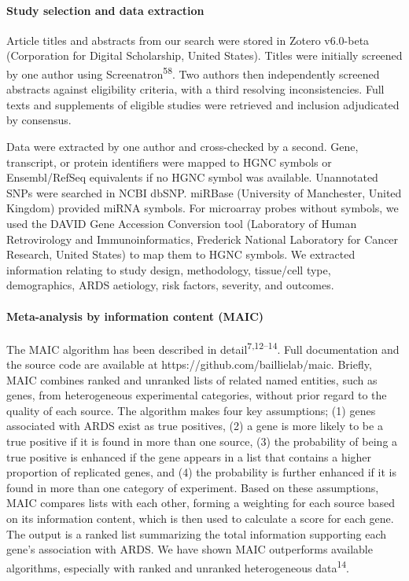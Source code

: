 \documentclass[
  11,
  a4paper,
]{article}
\let\oldparagraph\paragraph
\renewcommand{\paragraph}[1]{\oldparagraph{#1}\mbox{}}
\begin{document}
\hypertarget{study-selection-and-data-extraction}{%
\paragraph{Study selection and data
extraction}\label{study-selection-and-data-extraction}}

Article titles and abstracts from our search were stored in Zotero
v6.0-beta (Corporation for Digital Scholarship, United States). Titles
were initially screened by one author using
Screenatron\textsuperscript{58}. Two authors then independently screened
abstracts against eligibility criteria, with a third resolving
inconsistencies. Full texts and supplements of eligible studies were
retrieved and inclusion adjudicated by consensus.

Data were extracted by one author and cross-checked by a second. Gene,
transcript, or protein identifiers were mapped to HGNC symbols or
Ensembl/RefSeq equivalents if no HGNC symbol was available. Unannotated
SNPs were searched in NCBI dbSNP. miRBase (University of Manchester,
United Kingdom) provided miRNA symbols. For microarray probes without
symbols, we used the DAVID Gene Accession Conversion tool (Laboratory of
Human Retrovirology and Immunoinformatics, Frederick National Laboratory
for Cancer Research, United States) to map them to HGNC symbols. We
extracted information relating to study design, methodology, tissue/cell
type, demographics, ARDS aetiology, risk factors, severity, and
outcomes.

\hypertarget{meta-analysis-by-information-content-maic-1}{%
\paragraph{Meta-analysis by information content
(MAIC)}\label{meta-analysis-by-information-content-maic-1}}

The MAIC algorithm has been described in
detail\textsuperscript{7,12--14}. Full documentation and the source code
are available at https://github.com/baillielab/maic. Briefly, MAIC
combines ranked and unranked lists of related named entities, such as
genes, from heterogeneous experimental categories, without prior regard
to the quality of each source. The algorithm makes four key assumptions;
(1) genes associated with ARDS exist as true positives, (2) a gene is
more likely to be a true positive if it is found in more than one
source, (3) the probability of being a true positive is enhanced if the
gene appears in a list that contains a higher proportion of replicated
genes, and (4) the probability is further enhanced if it is found in
more than one category of experiment. Based on these assumptions, MAIC
compares lists with each other, forming a weighting for each source
based on its information content, which is then used to calculate a
score for each gene. The output is a ranked list summarizing the total
information supporting each gene's association with ARDS. We have shown
MAIC outperforms available algorithms, especially with ranked and
unranked heterogeneous data\textsuperscript{14}.
\end{document}
